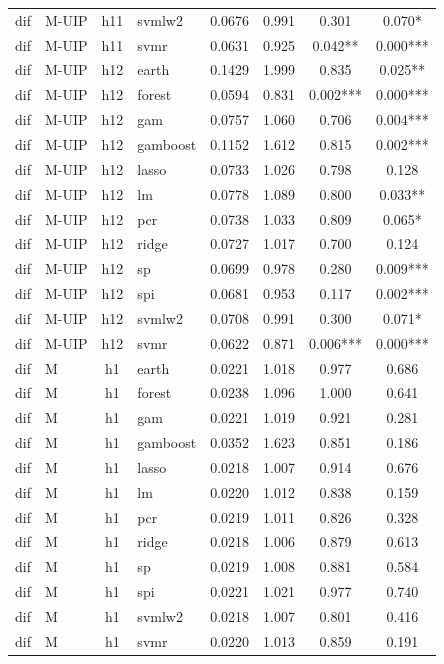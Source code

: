 \begin{ThreePartTable}
\begin{longtable}[t]{llclcccc}
dif & M-UIP & h11 & svmlw2 & 0.0676 & 0.991 & 0.301 & 0.070*\\
dif & M-UIP & h11 & svmr & 0.0631 & 0.925 & 0.042** & 0.000***\\
\addlinespace
dif & M-UIP & h12 & earth & 0.1429 & 1.999 & 0.835 & 0.025**\\
dif & M-UIP & h12 & forest & 0.0594 & 0.831 & 0.002*** & 0.000***\\
dif & M-UIP & h12 & gam & 0.0757 & 1.060 & 0.706 & 0.004***\\
dif & M-UIP & h12 & gamboost & 0.1152 & 1.612 & 0.815 & 0.002***\\
dif & M-UIP & h12 & lasso & 0.0733 & 1.026 & 0.798 & 0.128\\
dif & M-UIP & h12 & lm & 0.0778 & 1.089 & 0.800 & 0.033**\\
dif & M-UIP & h12 & pcr & 0.0738 & 1.033 & 0.809 & 0.065*\\
dif & M-UIP & h12 & ridge & 0.0727 & 1.017 & 0.700 & 0.124\\
dif & M-UIP & h12 & sp & 0.0699 & 0.978 & 0.280 & 0.009***\\
dif & M-UIP & h12 & spi & 0.0681 & 0.953 & 0.117 & 0.002***\\
dif & M-UIP & h12 & svmlw2 & 0.0708 & 0.991 & 0.300 & 0.071*\\
dif & M-UIP & h12 & svmr & 0.0622 & 0.871 & 0.006*** & 0.000***\\
\addlinespace
dif & M & h1 & earth & 0.0221 & 1.018 & 0.977 & 0.686\\
dif & M & h1 & forest & 0.0238 & 1.096 & 1.000 & 0.641\\
dif & M & h1 & gam & 0.0221 & 1.019 & 0.921 & 0.281\\
dif & M & h1 & gamboost & 0.0352 & 1.623 & 0.851 & 0.186\\
dif & M & h1 & lasso & 0.0218 & 1.007 & 0.914 & 0.676\\
dif & M & h1 & lm & 0.0220 & 1.012 & 0.838 & 0.159\\
dif & M & h1 & pcr & 0.0219 & 1.011 & 0.826 & 0.328\\
dif & M & h1 & ridge & 0.0218 & 1.006 & 0.879 & 0.613\\
dif & M & h1 & sp & 0.0219 & 1.008 & 0.881 & 0.584\\
dif & M & h1 & spi & 0.0221 & 1.021 & 0.977 & 0.740\\
dif & M & h1 & svmlw2 & 0.0218 & 1.007 & 0.801 & 0.416\\
dif & M & h1 & svmr & 0.0220 & 1.013 & 0.859 & 0.191\\

\end{longtable}
\end{ThreePartTable}

